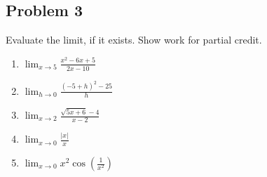 \documentclass[10pt]{book}
\theoremstyle{definition}
\begin{document}
\subsection*{Problem 3} Evaluate the limit, if it exists. Show work for partial credit.
\begin{enumerate}[label=(\alph*)]
    \item $\displaystyle \lim_{x\rightarrow 5}\frac{x^2-6x+5}{2x-10}$\vspace{3.75cm}
    \item $\displaystyle \lim_{h\rightarrow 0}\frac{(-5+h)^2-25}{h}$\vspace{3.75cm}
    \item $\displaystyle \lim_{x\rightarrow 2}\frac{\sqrt{5x+6}-4}{x-2}$\vspace{3.75cm}
    \item $\displaystyle \lim_{x\rightarrow 0}\frac{|x|}{x}$\vspace{3.75cm}
    \item $\displaystyle \lim_{x\rightarrow 0}x^2\cos\left(\frac{1}{x^2}\right)$
\end{enumerate}
\end{document}
